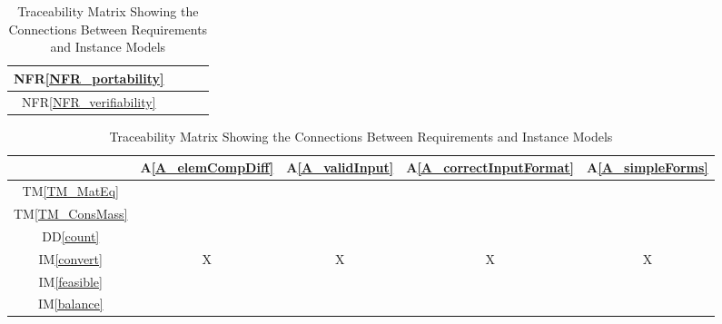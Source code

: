 \documentclass[12pt]{article}
\newcommand{\ddref}[1]{DD\ref{#1}}
\newcommand{\tmref}[1]{TM\ref{#1}}
\newcommand{\aref}[1]{A\ref{#1}}
\newcommand{\iref}[1]{IM\ref{#1}}
\newcommand{\nfrref}[1]{NFR\ref{#1}}
\begin{document}
\begin{table}[h!]
{\begin{tabular}{|c|c|c|c|}
      \nfrref{NFR_portability}       &                &                 &                \\ \hline %
      \nfrref{NFR_verifiability}     &                &                 &                \\ \hline %
    \end{tabular}
    \caption{Traceability Matrix Showing the Connections Between Requirements and Instance Models}
    \label{Table:R_trace}
  }
  \hfill
  \parbox{.45\linewidth}{
    \centering
    \begin{tabular}{|c|c|c|c|c|}
      \hline
                                      & \aref{A_elemCompDiff} & \aref{A_validInput} & \aref{A_correctInputFormat} & \aref{A_simpleForms} \\
      \hline
      \tmref{TM_MatEq}                &                       &                     &                             &                      \\ \hline
      \tmref{TM_ConsMass}             &                       &                     &                             &                      \\ \hline
      \ddref{count}                   &                       &                     &                             &                      \\ \hline
      \iref{convert}                  & X                     & X                   & X                           & X                    \\ \hline
      \iref{feasible}                 &                       &                     &                             &                      \\ \hline
      \iref{balance}                  &                       &                     &                             &                      \\ \hline

\end{tabular}}
\end{table}
\end{document}
